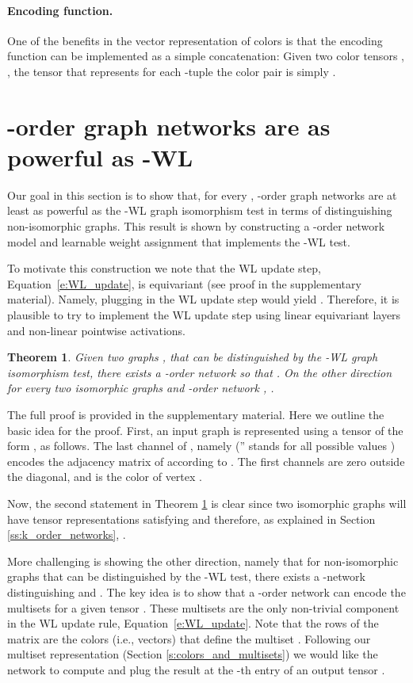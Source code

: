 \documentclass{article}
\newtheorem{theorem}{Theorem}
\newcommand{\ie}{{i.e.}}
\def\Eqref#1{Equation~\ref{#1}}
\begin{document}
\paragraph{Encoding function.} One of the benefits in the vector representation of colors is that the encoding function can be implemented as a simple concatenation: Given two color tensors , , the tensor that represents for each -tuple  the color pair  is simply .  






\section{-order graph networks are as powerful as -WL}\label{s:as_powerful}
Our goal in this section is to show that, for every , -order graph networks \citep{maron2018invariant} are at least as powerful as the -WL graph isomorphism test in terms of distinguishing non-isomorphic graphs. This result is shown by constructing a -order network model and learnable weight assignment that implements the -WL test. 

To motivate this construction we note that the WL update step, \Eqref{e:WL_update}, is equivariant (see proof in the supplementary material). Namely, plugging in  the WL update step would yield . Therefore, it is plausible to try to implement the WL update step using linear equivariant layers and non-linear pointwise activations. 


\begin{theorem}\label{thm:k_wl_k_order}
Given two graphs ,  that can be distinguished by the -WL graph isomorphism test, there exists a -order network  so that . On the other direction for every two isomorphic graphs  and -order network , .
\end{theorem}
The full proof is provided in the supplementary material. Here we outline the basic idea for the proof. First, an input graph  is represented using a tensor of the form  , as follows. 
The last channel of , namely  ('' stands for all possible values ) encodes the adjacency matrix of  according to . The first  channels  are zero outside the diagonal, and  is the color of vertex . 

Now, the second statement in Theorem \ref{thm:k_wl_k_order} is clear since two isomorphic graphs  will have tensor representations satisfying  and therefore, as explained in Section \ref{ss:k_order_networks}, . 

More challenging is showing the other direction, namely that for non-isomorphic graphs   that can be distinguished by the -WL test, there exists a -network distinguishing  and . The key idea is to show that a -order network can encode the multisets  for a given tensor . These multisets are the only non-trivial component in the WL update rule, \Eqref{e:WL_update}. 
Note that the rows of the matrix  are the colors (\ie, vectors) that define the multiset . Following our multiset representation (Section \ref{s:colors_and_multisets}) we would like the network to compute  and plug the result at the -th entry of an output tensor . 
\end{document}
